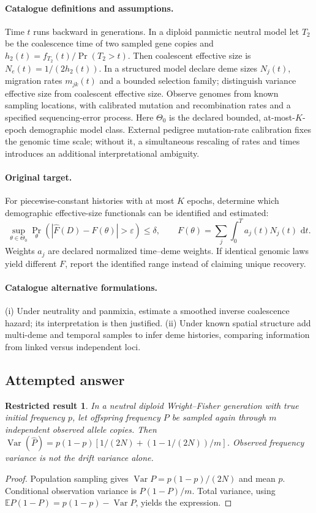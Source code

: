 \documentclass[11pt]{article}
\newcommand{\E}{\mathbb E}
\DeclareMathOperator{\Var}{Var}
\newcommand{\dd}{\,\mathrm d}
\providecommand{\E}{\mathbb E}
\providecommand{\Var}{\operatorname{Var}}
\newtheorem{attemptresult}{Restricted result}[section]
\begin{document}
\paragraph{Catalogue definitions and assumptions.}
Time $t$ runs backward in generations. In a diploid panmictic neutral model let $T_2$ be the coalescence time of two sampled gene copies and $h_2(t)=f_{T_2}(t)/\Pr(T_2>t)$. Then coalescent effective size is $N_e(t)=1/(2h_2(t))$. In a structured model declare deme sizes $N_j(t)$, migration rates $m_{jk}(t)$ and a bounded selection family; distinguish variance effective size from coalescent effective size. Observe genomes from known sampling locations, with calibrated mutation and recombination rates and a specified sequencing-error process. Here $\Theta_0$ is the declared bounded, at-most-$K$-epoch demographic model class. External pedigree mutation-rate calibration fixes the genomic time scale; without it, a simultaneous rescaling of rates and times introduces an additional interpretational ambiguity.
\paragraph{Original target.}
For piecewise-constant histories with at most $K$ epochs, determine which demographic effective-size functionals can be identified and estimated:
\[
 \sup_{\theta\in\Theta_0}\Pr_\theta\!\left(
 |\widehat F(D)-F(\theta)|>\varepsilon\right)\le\delta,
 \qquad F(\theta)=\sum_j\int_0^T a_j(t)N_j(t)\,\dd t.
\]
Weights $a_j$ are declared normalized time--deme weights. If identical genomic laws yield different $F$, report the identified range instead of claiming unique recovery.
\paragraph{Catalogue alternative formulations.}
(i) Under neutrality and panmixia, estimate a smoothed inverse coalescence hazard; its interpretation is then justified. (ii) Under known spatial structure add multi-deme and temporal samples to infer deme histories, comparing information from linked versus independent loci.
\subsection{Attempted answer}
\begin{attemptresult}
In a neutral diploid Wright--Fisher generation with true initial frequency $p$, let offspring frequency $P$ be sampled again through $m$ independent observed allele copies. Then $\Var(\widehat P)=p(1-p)[1/(2N)+(1-1/(2N))/m]$. Observed frequency variance is not the drift variance alone.
\end{attemptresult}
\begin{proof}
Population sampling gives $\Var P=p(1-p)/(2N)$ and mean $p$. Conditional observation variance is $P(1-P)/m$. Total variance, using $\E P(1-P)=p(1-p)-\Var P$, yields the expression.
\end{proof}
\end{document}

